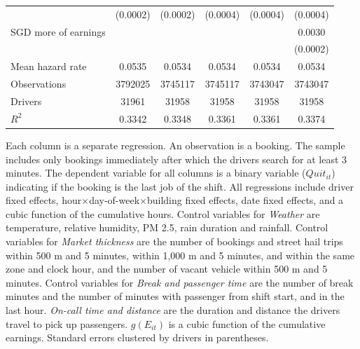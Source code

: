 \documentclass[reviewmode,AEJ]{AEA}
\begin{document}
\begin{table}[]
{\begin{tabularx}{\textwidth}{l@{\extracolsep{\fill}}*{5}{S[table-format = 0.4, table-space-text-pre={**}, table-space-text-post={-**}]}}
                &    (0.0002)         &    (0.0002)         &    (0.0004)         &    (0.0004)         &    (0.0004)         \\
     SGD more of earnings&                     &                     &                     &                     &      0.0030\sym{***}         \\
                &                     &                     &                     &                     &    (0.0002)         \\
    \midrule
    Mean hazard rate&      0.0535         &      0.0534         &      0.0534         &      0.0534         &      0.0534         \\
    Observations&\num{3792025}         &\num{3745117}         &\num{3745117}         &\num{3743047}         &\num{3743047}         \\
    Drivers     & \num{31961}         & \num{31958}         & \num{31958}         & \num{31958}         & \num{31958}         \\
    \(R^2\)     &      0.3342         &      0.3348         &      0.3361         &      0.3361         &      0.3374         \\
    \bottomrule
    \end{tabularx}
    }
	\begin{tablenotes}
	\small
        Each column is a separate regression. An observation is a booking. The sample includes only bookings immediately after which the drivers search for at least 3 minutes. The dependent variable for all columns is a binary variable ($Quit_{it}$) indicating if the booking is the last job of the shift. All regressions include driver fixed effects, hour\(\times\)day-of-week\(\times\)building fixed effects, date fixed effects, and a cubic function of the cumulative hours. Control variables for \textit{Weather} are temperature, relative humidity, PM 2.5, rain duration and rainfall. Control variables for \textit{Market thickness} are the number of bookings and street hail trips within 500 m and 5 minutes, within 1,000 m and 5 minutes, and within the same zone and clock hour, and the number of vacant vehicle within 500 m and 5 minutes. Control variables for \textit{Break and passenger time} are the number of break minutes and the number of minutes with passenger from shift start, and in the last hour. \textit{On-call time and distance} are the duration and distance the drivers travel to pick up passengers. \(g(E_{it})\) is a cubic function of the cumulative earnings. Standard errors clustered by drivers in parentheses.%
	\end{tablenotes}
\end{table}
\end{document}
